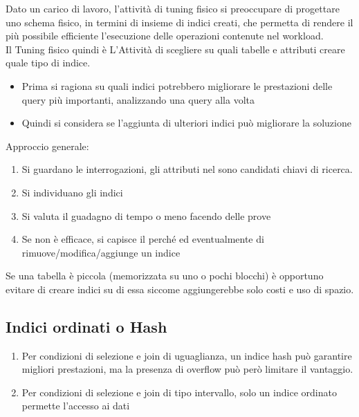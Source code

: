 Dato un carico di lavoro, l’attività di tuning fisico si preoccupare di progettare uno schema fisico, in termini di insieme di indici creati, che permetta di rendere il più possibile efficiente l’esecuzione delle operazioni contenute nel workload.\\
Il Tuning fisico quindi \`e L'Attività di scegliere su quali tabelle e attributi creare quale tipo di indice.
\begin{itemize}
    \item Prima si ragiona su quali indici potrebbero migliorare le prestazioni delle query più importanti, analizzando una query alla volta
    \item Quindi si considera se l’aggiunta di ulteriori indici può migliorare la soluzione
\end{itemize}
Approccio generale:
\begin{enumerate}
    \item Si guardano le interrogazioni, gli attributi nel  sono candidati chiavi di ricerca.
    \item Si individuano gli indici
    \item Si valuta il guadagno di tempo o meno facendo delle prove
    \item Se non \`e efficace, si capisce il perché ed eventualmente di rimuove/modifica/aggiunge un indice
\end{enumerate}
Se una tabella \`e piccola (memorizzata su uno o pochi blocchi) \`e opportuno evitare di creare indici su di essa siccome aggiungerebbe solo costi e uso di spazio.

\subsection{Indici ordinati o Hash}
\begin{enumerate}
    \item Per condizioni di selezione e join di uguaglianza, un indice hash può garantire migliori prestazioni, ma la presenza di overflow può però limitare il vantaggio.
    \item Per condizioni di selezione e join di tipo intervallo, solo un indice ordinato permette l’accesso ai dati
\end{enumerate}

